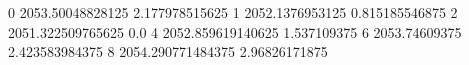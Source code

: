 0 2053.50048828125 2.177978515625
1 2052.1376953125 0.815185546875
2 2051.322509765625 0.0
4 2052.859619140625 1.537109375
6 2053.74609375 2.423583984375
8 2054.290771484375 2.96826171875
